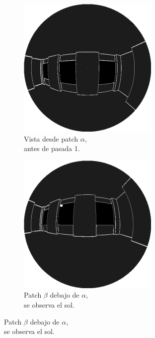 \begin{figure}[H]
	\centering
	\begin{subfigure}{0.24\textwidth}
		\centering
		\captionsetup{width=0.95\textwidth, justification=centering}
		\caption*{Vista desde patch $\alpha$,\\ antes de pasada 1.}
		\includegraphics[width=.95\linewidth]{media/radiosity1_eye.png}
	\end{subfigure}
	\begin{subfigure}{0.24\textwidth}
		\centering
		\captionsetup{width=0.95\textwidth, justification=centering}
		\caption*{Patch $\beta$ debajo de $\alpha$,\\ se observa el sol.}
		\includegraphics[width=.95\linewidth]{media/radiosity1_eye1.png}

\end{subfigure}
\end{figure}
